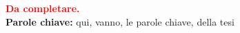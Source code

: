 \textbf{\textcolor{red}{Da completare.}}
\\
\textbf{Parole chiave:} qui, vanno, le parole chiave, della tesi %